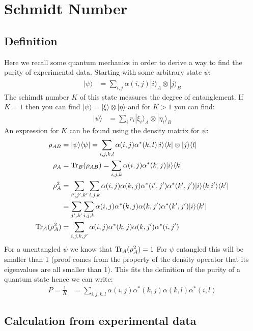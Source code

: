 \section{Schmidt Number}
\label{schmidtAppendix}
\subsection{Definition}
Here we recall some quantum mechanics in order to derive a way to find the purity of experimental data. Starting with some arbitrary state $\psi$:
\begin{align}
|\psi \rangle &= \sum_{i,j}\alpha(i,j)|i\rangle_A\otimes|j\rangle_B 
\end{align}
The schimdt number $K$ of this state measures the degree of entanglement. If $K=1$ then you can find $|\psi \rangle  = |\xi \rangle\otimes |\eta \rangle$ and for $K>1$ you can find: 
\begin{align}
|\psi \rangle &=\sum_{i} r_i|\xi_i \rangle_A\otimes |\eta_i \rangle_B
\end{align}
An expression for $K$ can be found using the density matrix for $\psi$:
\begin{align}
\rho_{AB} &=|\psi \rangle \langle\psi| = \sum_{i,j,k,l}\alpha(i,j)\alpha^*(k,l)|i\rangle\langle k| \otimes|j\rangle \langle l| \\
\rho_{A} &=\operatorname{Tr}_B(\rho_{AB}) = \sum_{i,j,k}\alpha(i,j)\alpha^*(k,j)|i\rangle \langle k|  \\
\rho_{A}^2 &= \sum_{i',j',k'}\sum_{i,j,k}\alpha(i,j)\alpha(k,j)\alpha^*(i',j')\alpha^*(k',j')|i\rangle \langle k|i'\rangle \langle k'|  \\
&= \sum_{j',k'}\sum_{i,j,k}\alpha(i,j)\alpha^*(k,j)\alpha(k,j')\alpha^*(k',j')|i\rangle \langle k'|  \\
\operatorname{Tr}_A(\rho_{A}^2)&= \sum_{i,j,k,j'}\alpha(i,j)\alpha^*(k,j)\alpha(k,j')\alpha^*(i,j')  \\
\end{align}
For a unentangled $\psi$ we know that $\operatorname{Tr}_A(\rho_{A}^2)=1$ For $\psi$ entangled this will be smaller than 1 (proof comes from the property of the density operator that its eigenvalues are all smaller than 1). This fits the definition of the purity of a quantum state hence we can write:
\begin{align} \label{theShit}
P = \frac{1}{K}&= \sum_{i,j,k,l}\alpha(i,j)\alpha^*(k,j)\alpha(k,l)\alpha^*(i,l)
\end{align}
\subsection{Calculation from experimental data}
